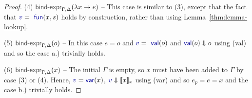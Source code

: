 \documentclass[acmsmall,anonymous,fleqn]{acmart}\settopmatter{printfolios=false,printccs=false,printacmref=false}
\theoremstyle{plain}
\theoremstyle{definition}
\newcommand{\ident}[1]{\textnormal{\textcolor{idclr}{\sffamily #1}}}
\newcommand{\bndclr}[1]{\textcolor{kvdclr}{#1}}
\newcommand{\bnd}[1]{\textnormal{\textcolor{kvdclr}{\sffamily #1}}}
\newcommand{\rname}[1]{{\sffamily\small(#1)}}
\begin{document}
\begin{proof}
\vspace{0.75em}\noindent(4) $\ident{bind-expr}_{\Gamma, \Delta}(\lambda x\rightarrow e)$  --
  This case is similar to (3), except that the fact that $\bndclr{v} = \bnd{fun}(x, s)$
  holds by construction, rather than using Lemma~\ref{thm:lemma-lookup}.

\vspace{0.75em}\noindent(5) $\ident{bind-expr}_{\Gamma, \Delta}(o)$ -- In this case $e=o$ and $\bndclr{v} = \bnd{val}(o)$
  and $\bnd{val}(o)\Downarrow o$ using \rname{val} and so the case a.) trivially holds.

\vspace{0.75em}\noindent(6) $\ident{bind-expr}_{\Gamma, \Delta}(x)$ -- The initial $\Gamma$ is empty,
  so $x$ must have been added to $\Gamma$ by case (3) or (4). Hence,
  $\bndclr{v}=\bnd{var}(x)$, $\bndclr{v}\Downarrow \llbracket x \rrbracket_{x}$ using \rname{var}
  and so $e_p = e = x$ and the case b.) trivially holds.

\end{proof}
\end{document}

